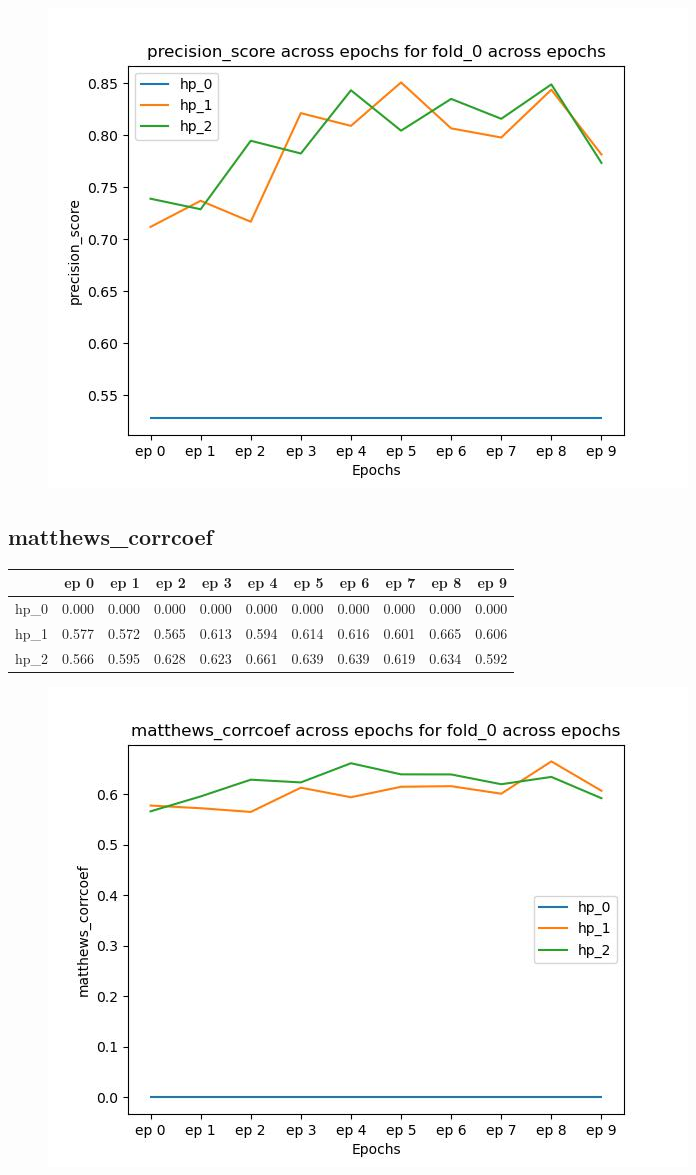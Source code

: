 \documentclass{article}
\begin{document}
\begin{figure}[H]
\includegraphics[scale = 0.75]{fold_0/precision_score}
\end{figure}
\subsection{matthews\_corrcoef}
\begin{tabular}{lrrrrrrrrrr}
\toprule
{} &   ep 0 &   ep 1 &   ep 2 &   ep 3 &   ep 4 &   ep 5 &   ep 6 &   ep 7 &   ep 8 &   ep 9 \\
\midrule
hp\_0 &  0.000 &  0.000 &  0.000 &  0.000 &  0.000 &  0.000 &  0.000 &  0.000 &  0.000 &  0.000 \\
hp\_1 &  0.577 &  0.572 &  0.565 &  0.613 &  0.594 &  0.614 &  0.616 &  0.601 &  0.665 &  0.606 \\
hp\_2 &  0.566 &  0.595 &  0.628 &  0.623 &  0.661 &  0.639 &  0.639 &  0.619 &  0.634 &  0.592 \\
\bottomrule
\end{tabular}

\begin{figure}[H]
\includegraphics[scale = 0.75]{fold_0/matthews_corrcoef}
\end{figure}
\end{document}
